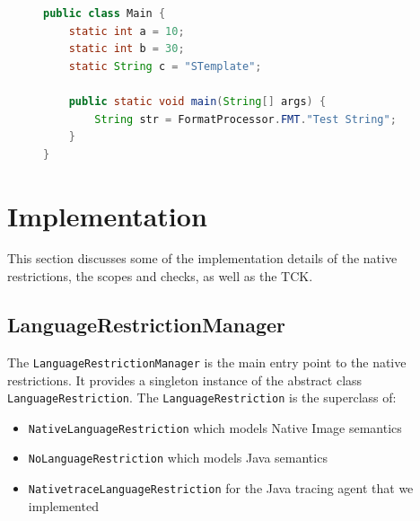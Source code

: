\begin{figure}[ht]
    \centering
\begin{lstlisting}[language=Java]
public class Main {
    static int a = 10;
    static int b = 30;
    static String c = "STemplate";

    public static void main(String[] args) {
        String str = FormatProcessor.FMT."Test String";
    }
}
\end{lstlisting}
    \caption{}
    \label{fig:format_processor}
\end{figure}






\chapter{Implementation}

This section discusses some of the implementation details of the native restrictions, the scopes and checks, as well as the TCK.

\section{LanguageRestrictionManager}
The \verb|LanguageRestrictionManager| is the main entry point to the native restrictions. It provides a singleton instance of the abstract class \verb|LanguageRestriction|.
The \verb|LanguageRestriction| is the superclass of: 
\begin{itemize}
    \item \texttt{NativeLanguageRestriction} which models Native Image semantics
    \item \texttt{NoLanguageRestriction} which  models Java semantics
    \item \texttt{NativetraceLanguageRestriction} for the Java tracing agent that we implemented
\end{itemize}

